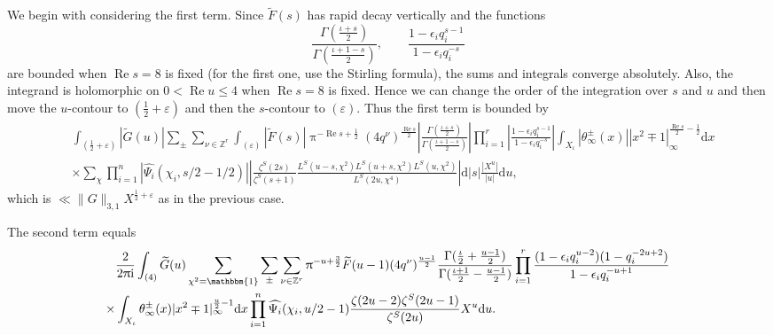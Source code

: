 \documentclass[10pt,oneside,reqno]{amsart}
\makeatletter
\newcommand\rmd{\mathrm{d}}
\newcommand\rmi{\mathrm{i}}
\newcommand\ZZ{\mathbb{Z}}
\newcommand\triv{\mathbbm{1}}
\newcommand\dpii{2\uppi\rmi}
\renewcommand\Re{\mathop{\mathrm{Re}}}
\renewcommand\leq{\leqslant}
\theoremstyle{THEOREM}
\theoremstyle{DEFINITION}
\theoremstyle{EXERCISE}
\numberwithin{equation}{section}
\renewenvironment{proof}[1][\proofname]{\par
  \vspace{-6pt}
  \pushQED{\qed}
  \normalfont \topsep6\p@\@plus6\p@\relax
  \trivlist
  \item[\hskip\labelsep\rmfamily\bfseries
    #1\@addpunct{:}]\ignorespaces
}{
  \popQED\endtrivlist\@endpefalse
  \vspace{-6pt}
}
\makeatother
\begin{document}
\begin{proof}
We begin with considering the first term. Since $\widetilde{F}(s)$ has rapid decay vertically and the functions
\[
\frac{\Gamma(\frac{\iota+s}{2})}{\Gamma(\frac{\iota+1-s}{2})},\qquad\frac{1-\epsilon_i q_i^{s-1}}{1-\epsilon_iq_i^{-s}} 
\] 
are bounded when $\Re s=8$ is fixed (for the first one, use the Stirling formula), the sums and integrals converge absolutely. Also, the integrand is holomorphic on $0<\Re u\leq 4$ when $\Re s=8$ is fixed. Hence we can change the order of the integration over $s$ and $u$ and then move the $u$-contour to $(\frac12+\varepsilon)$ and then the $s$-contour to $(\varepsilon)$. Thus the first term is bounded by
\begin{align*}
&\int_{(\frac12+\varepsilon)}|\widetilde{G}(u)|\sum_{\pm}\sum_{\nu\in \ZZ^r}\int_{(\varepsilon)}|\widetilde{F}(s)|\uppi^{-\Re s+\frac12}(4q^\nu)^{\frac{\Re s}{2}} \left|\frac{\Gamma(\frac{\iota+s}{2})}{\Gamma(\frac{\iota+1-s}{2})}\right|\prod_{i=1}^{r} \left|\frac{1-\epsilon_i q_i^{s-1}}{1-\epsilon_iq_i^{-s}}\right|\int_{X_\iota}|\theta_\infty^\pm(x)||x^2\mp 1|_\infty^{\frac{\Re s}{2}-\frac12}\rmd x \\
  &\times\sum_{\chi}\prod_{i=1}^{n}|\widehat{\Psi_i}(\chi_i, s/2-1/2)|\left|\frac{\zeta^S(2s)}{\zeta^S(s+1)} \frac{L^S(u-s,\chi^2)L^S(u+s,\chi^2)L^S(u,\chi^2)}{L^S(2u,\chi^4)}\right|\rmd |s|\frac{|X^u|}{|u|}\rmd u,
\end{align*}
which is $\ll \|G\|_{3,1}X^{\frac12+\varepsilon}$ as in the previous case.

The second term equals
\begin{equation}\label{eq:secondterm2}
\begin{split}
&\frac{2}{\dpii}\int_{(4)}\widetilde{G}(u)\sum_{\chi^2=\triv}\sum_{\pm}\sum_{\nu\in \ZZ^r}\uppi^{  -u+\frac32}\widetilde{F}(u-1)(4q^\nu)^{\frac{u-1}{2}} \frac{\Gamma(\frac{\iota}{2}+\frac{u-1}{2})}{\Gamma(\frac{\iota+1}{2}-\frac{u-1}{2})} \prod_{i=1}^{r}\frac{(1-\epsilon_i q_i^{u-2})(1-q_i^{-2u+2})}{1-\epsilon_iq_i^{-u+1}}\\
\times&\int_{X_\iota}\theta_\infty^\pm(x)|x^2\mp 1|_\infty^{\frac u2-1}\rmd x\prod_{i=1}^{n}\widehat{\Psi_i}(\chi_i,u/2-1)\frac{\zeta(2u-2)\zeta^S(2u-1)}
{\zeta^S(2u)}X^u\rmd u.
\end{split}
\end{equation}


\end{proof}
\end{document}
